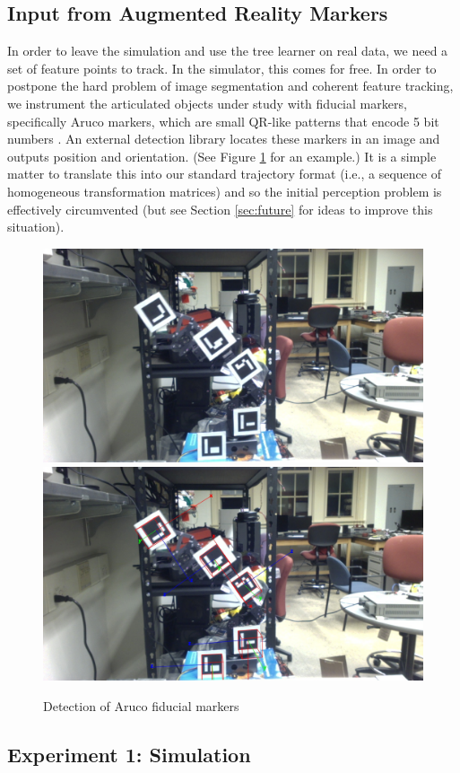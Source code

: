 \documentclass[letterpaper, 10 pt, conference]{ieeeconf}  %
\begin{document}
\subsection{Input from Augmented Reality Markers}
In order to leave the simulation and use the tree learner on real data, we need a set of feature points to track. In the simulator, this comes for free. In order to postpone the hard problem of image segmentation and coherent feature tracking, we instrument the articulated objects under study with fiducial markers, specifically Aruco markers, which are small QR-like patterns that encode 5 bit numbers \cite{aruco}. An external detection library locates these markers in an image and outputs position and orientation. (See Figure \ref{fig:aruco} for an example.) It is a simple matter to translate this into our standard trajectory format (i.e., a sequence of homogeneous transformation matrices) and so the initial perception problem is effectively circumvented (but see Section \ref{sec:future} for ideas to improve this situation).

\begin{figure}[ht]
  \centering
  \includegraphics[width=.235\textwidth,clip,trim=6in 0.1in 7in 7in]{img/armdance_clean_343.jpg}
  \includegraphics[width=.235\textwidth,clip,trim=6in 0.1in 7in 7in]{img/armdance_dirty_343.jpg}
  \caption{Detection of Aruco fiducial markers}
  \label{fig:aruco}
\end{figure}


\subsection{Experiment 1: Simulation}
\end{document}
